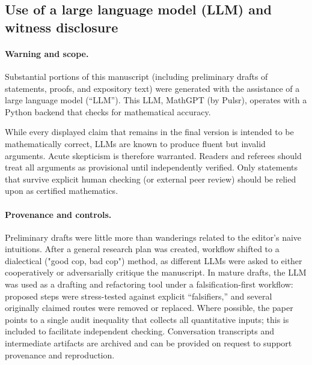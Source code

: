 \subsection{Use of a large language model (LLM) and witness disclosure}\label{sec:llm-methods}

\paragraph{Warning and scope.}
Substantial portions of this manuscript (including preliminary drafts of statements, proofs, and expository text) were generated with the assistance of a large language model (“LLM”). This LLM, MathGPT (by Pulsr), operates with a Python backend that checks for mathematical accuracy.

While every displayed claim that remains in the final version is intended to be mathematically correct, LLMs are known to produce fluent but invalid arguments. Acute skepticism is therefore warranted.
Readers and referees should treat all arguments as provisional until independently verified. Only statements that survive explicit human checking (or external peer review) should be relied upon as certified mathematics.

\paragraph{Provenance and controls.}
Preliminary drafts were little more than wanderings related to the editor's naive intuitions. After a general research plan was created, workflow shifted to a dialectical ("good cop, bad cop") method, as different LLMs were asked to either cooperatively or adversarially critique the manuscript. In mature drafts, the LLM was used as a drafting and refactoring tool under a falsification-first workflow: proposed steps were stress-tested against explicit “falsifiers,” and several originally claimed routes were removed or replaced. 
Where possible, the paper points to a single audit inequality that collects all quantitative inputs; this is included to facilitate independent checking.
Conversation transcripts and intermediate artifacts are archived and can be provided on request to support provenance and reproduction.

